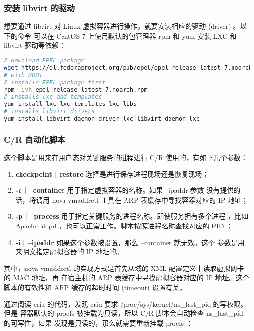 \subsubsection{安装 libvirt 的驱动}

想要通过 libvirt 对 Linux 虚拟容器进行操作，就要安装相应的驱动 (driver) 。以下的命令
可以在 CentOS 7 上使用默认的包管理器 rpm 和 yum 安装 LXC 和 libvirt 驱动等依赖：

\begin{lstlisting}[language=bash]
# download EPEL package
wget https://dl.fedoraproject.org/pub/epel/epel-release-latest-7.noarch.rpm
# with ROOT
# installs EPEL package first
rpm -ivh epel-release-latest-7.noarch.rpm
# installs lxc and templates
yum install lxc lxc-templates lxc-libs
# installs libvirt drivers
yum install libvirt-daemon-driver-lxc libvirt-daemon-lxc
\end{lstlisting}

\subsubsection{C/R 自动化脚本}
\label{subsubsec:cr-automation}

这个脚本是用来在用户态对关键服务的进程进行 C/R 使用的，有如下几个参数：

\begin{enumerate}
    \item \textbf{checkpoint | restore} 选择是进行保存进程现场还是恢复现场；
    \item \textbf{-c | --container} 用于指定虚拟容器的名称。如果 --ipaddr 参数
    没有提供的话，将调用 nova-vmaddrctl 工具在 ARP 表缓存中寻找容器对应的 IP 地址；
    \item \textbf{-p | --process} 用于指定关键服务的进程名称。即使服务拥有多个进程
    ，比如 Apache httpd ，也可以正常工作。脚本按照进程名称查找对应的 PID ；
    \item \textbf{-i | --ipaddr} 如果这个参数被设置，那么 --container 就无效。这个
    参数是用来明文指定虚拟容器的 IP 地址的。
\end{enumerate}

其中，nova-vmaddrctl 的实现方式是首先从域的 XML 配置定义中读取虚拟网卡的 MAC 地址，再
在宿主机的 ARP 表缓存中寻找虚拟容器对应的 IP 地址。这个脚本的有效性和 ARP 缓存的超时时间
(timeout) 设置有关。

通过阅读 criu 的代码，发现 criu 要求 /proc/sys/kernel/ns\_last\_pid 的写权限。但是
容器默认的 procfs 被挂载为只读，所以 C/R 脚本会自动检查 ns\_last\_pid 的可写性，如果
发现是只读的，那么就需要重新挂载 procfs ：


